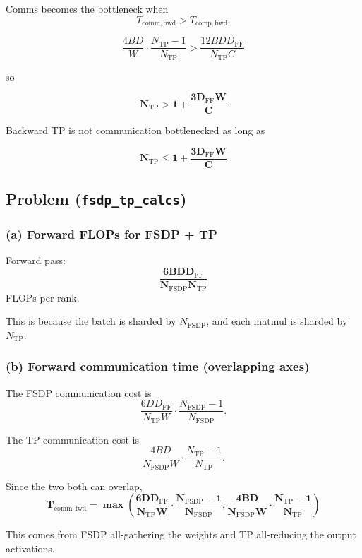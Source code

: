 \documentclass[11pt]{article}
\begin{document}
Comms becomes the bottleneck when
\[
T_{\mathrm{comm,bwd}} > T_{\mathrm{comp,bwd}}.
\]

\[
\frac{4 B D}{W}
\cdot
\frac{N_{\mathrm{TP}} - 1}{N_{\mathrm{TP}}}
>
\frac{12 B D D_{\mathrm{FF}}}{N_{\mathrm{TP}} C}
\]

so

\[
\mathbf{
N_{\mathrm{TP}} > 1 + \frac{3 D_{\mathrm{FF}} W}{C}
}
\]

Backward TP is not communication bottlenecked as long as

\[
\mathbf{
N_{\mathrm{TP}} \le 1 + \frac{3 D_{\mathrm{FF}} W}{C}
}
\]

\vspace{4em}


\subsection{Problem (\texttt{fsdp\_tp\_calcs})}

\subsubsection*{(a) Forward FLOPs for FSDP + TP}

Forward pass:
\[
\mathbf{
\frac{6 B D D_{\mathrm{FF}}}{N_{\mathrm{FSDP}} N_{\mathrm{TP}}}
}
\]
FLOPs per rank.

This is because the batch is sharded by \(N_{\mathrm{FSDP}}\), and each matmul is sharded by
\(N_{\mathrm{TP}}\).

\vspace{4em}

\subsubsection*{(b) Forward communication time (overlapping axes)}
The FSDP communication cost is
\[
\frac{6 D D_{\mathrm{FF}}}{N_{\mathrm{TP}} W}
\cdot
\frac{N_{\mathrm{FSDP}} - 1}{N_{\mathrm{FSDP}}}.
\]

The TP communication cost is
\[
\frac{4 B D}{N_{\mathrm{FSDP}} W}
\cdot
\frac{N_{\mathrm{TP}} - 1}{N_{\mathrm{TP}}}.
\]

Since the two both can overlap,
\[
\mathbf{
T_{\mathrm{comm,fwd}}
=
\max\left(
\frac{6 D D_{\mathrm{FF}}}{N_{\mathrm{TP}} W}
\cdot
\frac{N_{\mathrm{FSDP}} - 1}{N_{\mathrm{FSDP}}},
\frac{4 B D}{N_{\mathrm{FSDP}} W}
\cdot
\frac{N_{\mathrm{TP}} - 1}{N_{\mathrm{TP}}}
\right)
}
\]

This comes from FSDP all-gathering the weights and TP all-reducing the output activations.
\end{document}
